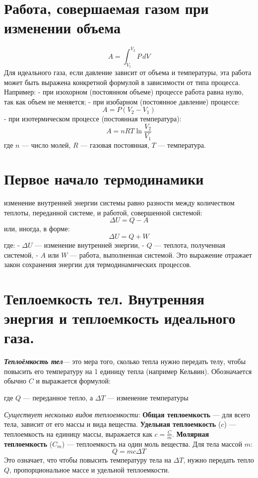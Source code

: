 \documentclass[14pt]{article}
\begin{document}
    \section{Работа, совершаемая газом при изменении объема}
    \[ A = \int_{V_1}^{V_2} P\, dV \] Для идеального газа, если давление зависит от объема и температуры, эта работа может быть выражена конкретной формулой в зависимости от типа процесса. Например: - при изохорном (постоянном объеме) процессе работа равна нулю, так как объем не меняется; - при изобарном (постоянное давление) процессе: \[ A = P (V_2 - V_1) \] - при изотермическом процессе (постоянная температура): \[ A = nRT \ln \frac{V_2}{V_1} \] где \(n\) — число молей, \(R\) — газовая постоянная, \(T\) — температура.


    \section{Первое начало термодинамики}
    изменение внутренней энергии системы равно разности между количеством теплоты, переданной системе, и работой, совершенной системой: \[ \Delta U = Q - A \] или, иногда, в форме: \[ \Delta U = Q + W \] где: - \(\Delta U\) — изменение внутренней энергии, - \(Q\) — теплота, полученная системой, - \(A\) или \(W\) — работа, выполненная системой. 
    \newline Это выражение отражает закон сохранения энергии для термодинамических процессов.


    \section{Теплоемкость тел. Внутренняя энергия и теплоемкость идеального газа.}
    \textbf{\textit{Теплоёмкость тел}}— это мера того, сколько тепла нужно передать телу, чтобы повысить его температуру на 1 единицу тепла (например Кельвин). 
    \newline Обозначается обычно \( C \) и выражается формулой: 
    \begin{center}
        \big[\[ C = \frac{Q}{\Delta T} \]\big]
        где \( Q \) — переданное тепло, а \( \Delta T \) — изменение температуры
    \end{center}
    \textit{Существует несколько видов теплоемкости}:
    \newline \textbf{Общая теплоемкость} — для всего тела, зависит от его массы и вида вещества. 
    \newline \textbf{Удельная теплоемкость} (\( c \)) — теплоемкость на единицу массы, выражается как \( c = \frac{C}{m} \). 
    \newline \textbf{Молярная теплоемкость} (\( C_m \)) — теплоемкость на один моль вещества. Для тела массой \( m \): \[ Q = mc \Delta T \] Это означает, что чтобы повысить температуру тела на \( \Delta T \), нужно передать тепло \( Q \), пропорциональное массе и удельной теплоемкости.
    
\end{document}

